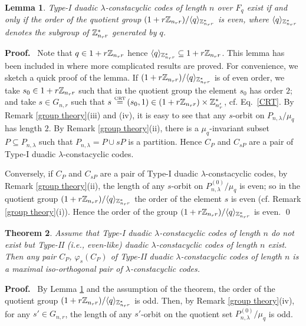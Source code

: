 \documentclass{article}
\newtheorem{Theorem}{Theorem}[section]
\newtheorem{Lemma}[Theorem]{Lemma}
\numberwithin{equation}{section}
\numberwithin{table}{section}
\def\Z{{\Bbb Z}}
\def\pf{\par{\bf Proof.}~ }
\def\M{{\varphi}} \def\N{{\psi}} \def\m{{\mu}}
\def\CRT{\,\mathop{=}\limits^{\mbox{\rm\tiny CRT}}\,}
\begin{document}
\begin{Lemma}\label{type i}
Type-I duadic $\lambda$-constacyclic codes of length $n$ over $F_q$
exist if and only if the order of the quotient group
$(1+r\Z_{n_r r})/\langle q\rangle_{\Z_{n_r r}^*}$ is even,
where $\langle q\rangle_{\Z_{n_r r}^*}$ denotes the subgroup of $\Z_{n_r r}^*$
generated by $q$.
\end{Lemma}

\pf Note that $q\in 1+r\Z_{n_r r}$ hence
$\langle q\rangle_{\Z_{n_r r}^*}\subseteq 1+r\Z_{n_r r}$.
This lemma has been included in \cite[Th.4]{CDFL}
where more complicated results are proved. For convenience,
we sketch a quick proof of the lemma. If
$(1+r\Z_{n_r r})/\langle q\rangle_{\Z_{n_r r}^*}$ is of even order,
we take $s_0\in 1+r\Z_{n_r r}$ such that in the quotient group
the element $s_0$ has order $2$; and take $s\in G_{n,r}$ such that
$s\CRT(s_0,1)\in(1+r\Z_{n_r r})\times\Z_{n_r'}^*$, cf. Eq.~\eqref{CRT}.
By Remark \ref{group theory}(iii) and (iv), it is easy to see that
any $s$-orbit on $P_{n,\lambda}/\mu_q$ has length $2$.
By Remark \ref{group theory}(ii), there is a $\mu_q$-invariant
subset $P\subseteq P_{n,\lambda}$ such that
$P_{n,\lambda}=P\cup sP$ is a partition. %
Hence $C_P$ and $C_{sP}$ are a pair of Type-I duadic $\lambda$-constacyclic codes.

Conversely, if $C_P$ and $C_{sP}$ are a pair of
Type-I duadic $\lambda$-constacyclic codes,
by Remark \ref{group theory}(ii), the length of any $s$-orbit on
$P_{n,\lambda}^{(0)}/\mu_q$ is even; so in the quotient group
$(1+r\Z_{n_r r})/\langle q\rangle_{\Z_{n_r r}^*}$
the order of the element $s$ is even (cf. Remark \ref{group theory}(i)).
Hence the order of the group
$(1+r\Z_{n_r r})/\langle q\rangle_{\Z_{n_r r}^*}$ is even.
\qed

\begin{Theorem}\label{iso-orth}
Assume that Type-I duadic $\lambda$-constacyclic codes of length $n$ 
do not exist but Type-II (i.e., even-like) duadic $\lambda$-constacyclic 
codes of length $n$ exist. Then any pair $C_P$, $\M_s(C_P)$ of 
Type-II duadic $\lambda$-constacyclic codes of length $n$ 
is a maximal iso-orthogonal pair of $\lambda$-constacyclic codes.
 \end{Theorem}

\pf By Lemma \ref{type i} and the assumption of the theorem,
the order of the quotient group
$(1+r\Z_{n_r r})/\langle q\rangle_{\Z_{n_r r}^*}$ is odd.
Then, by Remark \ref{group theory}(iv), for any $s'\in G_{n,r}$,
the length of any $s'$-orbit on the quotient set
$P_{n,\lambda}^{(0)}\big/\mu_q$ is odd.
\end{document}
